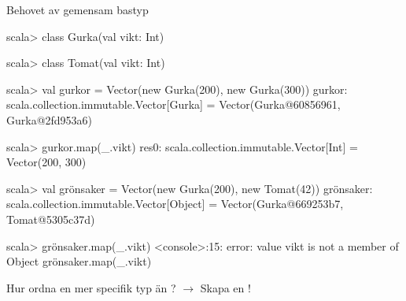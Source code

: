 \begin{Slide}{Behovet av gemensam bastyp}\SlideFontSmall
\begin{REPL}
scala> class Gurka(val vikt: Int)

scala> class Tomat(val vikt: Int)

scala> val gurkor = Vector(new Gurka(200), new Gurka(300))
gurkor: scala.collection.immutable.Vector[Gurka] = 
  Vector(Gurka@60856961, Gurka@2fd953a6)
  
scala> gurkor.map(_.vikt)
res0: scala.collection.immutable.Vector[Int] = Vector(200, 300)

scala> val grönsaker = Vector(new Gurka(200), new Tomat(42))
grönsaker: scala.collection.immutable.Vector[Object] = 
  Vector(Gurka@669253b7, Tomat@5305c37d)

scala> grönsaker.map(_.vikt)
<console>:15: error: value vikt is not a member of Object
       grönsaker.map(_.vikt)
\end{REPL}
Hur ordna en mer specifik typ än ? \pause$\rightarrow$ Skapa en !
\end{Slide}




